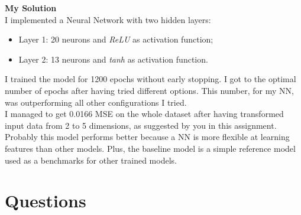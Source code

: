 \documentclass[11pt]{scrartcl}
\begin{document}
\textbf{My Solution}  \\
I implemented a Neural Network with two hidden layers:
\begin{itemize}
    \item Layer 1: 20 neurons and \textit{ReLU} as activation function;
    \item Layer 2: 13 neurons and \textit{tanh} as activation function.
\end{itemize}
I trained the model for 1200 epochs without early stopping. I got to the optimal number of epochs after having tried different options. This number, for my NN, was outperforming all other configurations I tried. \\
I managed to get 0.0166 MSE on the whole dataset after having transformed input data from 2 to 5 dimensions, as suggested by you in this assignment.\\
Probably this model performs better because a NN is more flexible at learning features than other models. Plus, the baseline model is a simple reference model used as a  benchmarks for other trained models.
\section*{Questions}
\end{document}
